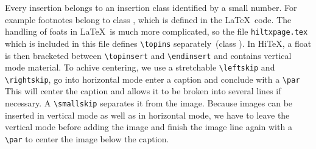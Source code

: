 \documentclass{article}
\begin{document}
Every insertion belongs to an insertion class identified by a
small number. For example footnotes belong to class \the\footins,
which is defined in the \LaTeX\ code.
The handling of foats in \LaTeX\ is much more complicated, so the
file {\tt hiltxpage.tex} which is included in this file defines
\verb/\topins/ separately\ifhint~(class \the\topins)\fi.
In Hi\TeX, a float is then bracketed between \verb/\topinsert/ and \verb/\endinsert/
and contains vertical mode material. To achive centering,
we use a stretchable \verb/\leftskip/ and \verb/\rightskip/,
go into horizontal mode enter a caption and conclude with a \verb/\par/
This will center the caption and allows it to be broken into several lines
if necessary. A \verb/\smallskip/ separates it from the image.
Because images can be inserted in vertical mode as well as in
horizontal mode, we have to leave the vertical mode before adding
the image and finish the image line again with a \verb/\par/ to center
the image below the caption.
\end{document}
